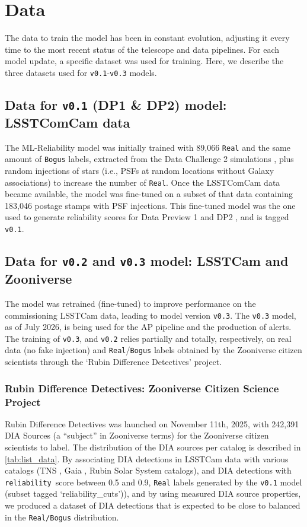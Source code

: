 \documentclass[DM,authoryear,toc]{lsstdoc}
\newcommand{\V}[1]{{\texttt{v0.#1}}}
\newcommand{\rel}{{\texttt{reliability}}}
\begin{document}
\section{Data}\label{sec:data}

The data to train the model has been in constant evolution, adjusting it every time to the most recent status of the telescope and data pipelines. For each model update, a specific dataset was used for training. Here, we describe the three datasets used for \V1-\V3 models.

\subsection{Data for \V1 (DP1 \& DP2) model: LSSTComCam data}

The ML-Reliability model was initially trained with 89,066 \texttt{Real} and the same amount of \texttt{Bogus} labels, extracted from the Data Challenge 2 simulations \cite[DC2,][]{2021arXiv210104855L}, plus random injections of stars (i.e., PSFs at random locations without Galaxy associations) to increase the number of \texttt{Real}. Once the LSSTComCam data became available, the model was fine-tuned on a subset of that data containing 183,046 postage stamps with PSF injections. This fine-tuned model was the one used to generate reliability scores for Data Preview 1 \cite[DP1,][]{RTN-095} and DP2 \citep{RTN-115}, and is tagged \V1. 

\subsection{Data for \V2 and \V3 model: LSSTCam and Zooniverse}

The model was retrained (fine-tuned) to improve performance on the commissioning LSSTCam data, leading to model version \V3. The \V3 model, as of July 2026, is being used for the AP pipeline and the production of alerts. The training of \V3, and \V2 relies partially and totally, respectively, on real data (no fake injection) and \texttt{Real}/\texttt{Bogus} labels obtained by the Zooniverse citizen scientists through the `Rubin Difference Detectives' project. 
 
\subsubsection{Rubin Difference Detectives: Zooniverse Citizen Science Project}\label{sec:zooniverse}

Rubin Difference Detectives was launched on November 11th, 2025, with 242,391 DIA Sources (a ``subject'' in Zooniverse terms) for the Zooniverse citizen scientists to label. The distribution of the DIA sources per catalog is described in \autoref{tab:list_data}. By associating DIA detections in LSSTCam data with various catalogs (TNS \citep{tns_cite}, Gaia \citep{rimoldini2023gaia}, Rubin Solar System catalogs), and  DIA detections with \rel\ score between 0.5 and 0.9, \texttt{Real} labels generated by the \V1 model (subset tagged `reliability\_cuts')), and by using measured DIA source properties, we produced a dataset of DIA detections that is expected to be close to balanced in the \texttt{Real/Bogus} distribution.
\end{document}
